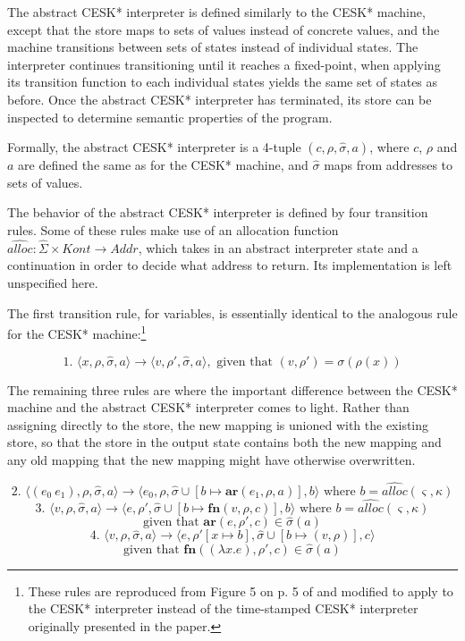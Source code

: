 \documentclass{article}
\begin{document}
The abstract CESK* interpreter is defined similarly to the CESK* machine, except that the store maps to sets of values instead of concrete values, and the machine transitions between sets of states instead of individual states. The interpreter continues transitioning until it reaches a fixed-point, when applying its transition function to each individual states yields the same set of states as before. Once the abstract CESK* interpreter has terminated, its store can be inspected to determine semantic properties of the program.

Formally, the abstract CESK* interpreter is a 4-tuple $(c, \rho, \hat{\sigma}, a)$, where $c$, $\rho$ and $a$ are defined the same as for the CESK* machine, and $\hat{\sigma}$ maps from addresses to sets of values.

The behavior of the abstract CESK* interpreter is defined by four transition rules. Some of these rules make use of an allocation function $\widehat{alloc} : \hat{\Sigma} \times Kont \to Addr$, which takes in an abstract interpreter state and a continuation in order to decide what address to return. Its implementation is left unspecified here.

The first transition rule, for variables, is essentially identical to the analogous rule for the CESK* machine:\footnote{These rules are reproduced from Figure 5 on p. 5 of \cite{aam} and modified to apply to the CESK* interpreter instead of the time-stamped CESK* interpreter originally presented in the paper.}

$$
\text{1. }
\langle x, \rho, \hat{\sigma}, a \rangle
\to
\langle v, \rho', \hat{\sigma}, a \rangle,
\text{ given that $(v, \rho') = \sigma(\rho(x))$}
$$

The remaining three rules are where the important difference between the CESK* machine and the abstract CESK* interpreter comes to light. Rather than assigning directly to the store, the new mapping is unioned with the existing store, so that the store in the output state contains both the new mapping and any old mapping that the new mapping might have otherwise overwritten.

$$
\text{2. }
\langle (e_0\ e_1), \rho, \hat{\sigma}, a \rangle
\to
\langle e_0, \rho, \hat{\sigma} \cup [b \mapsto \textbf{ar}(e_1, \rho, a)], b \rangle
\text{ where $b = \widehat{alloc}(\varsigma, \kappa)$}
$$
$$
\text{3. }
\langle v, \rho, \hat{\sigma}, a \rangle
\to
\langle e, \rho', \hat{\sigma} \cup [b \mapsto \textbf{fn}(v, \rho, c)], b \rangle
\text{ where $b = \widehat{alloc}(\varsigma, \kappa)$}
$$
$$
\text{given that } \textbf{ar}(e, \rho', c) \in \hat{\sigma}(a)
$$
$$
\text{4. }
\langle v, \rho, \hat{\sigma}, a \rangle
\to
\langle e, \rho'[x \mapsto b], \hat{\sigma} \cup [b \mapsto (v, \rho)], c \rangle
$$
$$
\text{given that } \textbf{fn}((\lambda x.e), \rho', c) \in \hat{\sigma}(a)
$$
\end{document}
